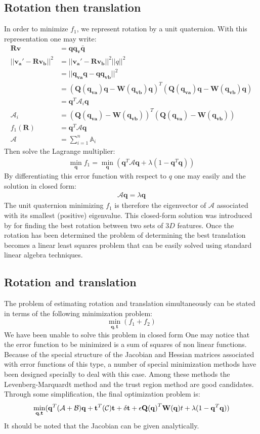 \documentclass[a4paper]{report}
\begin{document}
\subsection{Rotation then translation}
In order to minimize $f_1$, we represent rotation by a unit quaternion. With this
representation one may write:
\begin{align}
\mathbf{R}\mathbf{v}&=\mathbf{qq_v\bar{q}} \\
||\mathbf{v_a'-Rv_b}||^2&=||\mathbf{v_a'-Rv_b}||^2||q||^2 \\
&=||\mathbf{q_{va}q-qq_{vb}}||^2 \\
&=(\mathbf{Q(q_{va})q-W(q_{vb})q})^T(\mathbf{Q(q_{va})q-W(q_{vb})q}) \\
&=\mathbf{q}^T\mathcal{A}_i\mathbf{q} \\
\mathcal{A}_i&=(\mathbf{Q(q_{va})-W(q_{vb})})^T(\mathbf{Q(q_{va})-W(q_{vb})})\\
f_1(\mathbf{R})&=\mathbf{q}^T\mathcal{A}\mathbf{q} \\
\mathcal{A}&=\sum_{i=1}^{n}\mathbb{A}_i
\end{align}
Then solve the Lagrange multiplier:
\begin{align}
\min_{\mathbf{q}} f_1=\min_{\mathbf{q}} ({\mathbf{q}}^T\mathcal{A}{\mathbf{q}}+\lambda(1-{\mathbf{q}}^T{\mathbf{q}}))
\end{align}
By differentiating this error function with respect to $q$ one may easily and the solution in closed form:
\begin{align}
\mathcal{A}\mathbf{q}=\lambda\mathbf{q}
\end{align}
The unit quaternion minimizing $f_1$ is therefore the eigenvector of $\mathcal{A}$ associated with its smallest (positive) eigenvalue. This closed-form solution was introduced by for finding the best rotation between two sets of $3D$ features.
Once the rotation has been determined the problem of determining the best translation becomes a linear least \- squares problem that can be easily solved using standard linear algebra techniques.

\subsection{Rotation and translation}
The problem of estimating rotation and translation simultaneously can be stated in terms of the following minimization problem:
$$
\min_{\mathbf{q,t}}(f_1+f_2)
$$
We have been unable to solve this problem in closed form One may notice that the error function to be minimized is a sum of squares of non linear functions. Because of the special structure of the Jacobian and Hessian matrices associated with error functions of this type, a number of special minimization methods have been designed specially to deal with this case. Among these methods the Levenberg-Marquardt 
method and the trust region method are good candidates. Through some simplification, the final optimization problem is:
$$
\min_{\mathbf{q,t}} (\mathbf{q}^T(\mathcal{A}+\mathcal{B})\mathbf{q}+
\mathbf{t}^T(\mathcal{C})\mathbf{t}+\delta\mathbf{t}+\epsilon\mathbf{Q(q)}^T\mathbf{W(q)}t+\lambda(1-\mathbf{q}^T\mathbf{q})) \\
$$
It should be noted that the Jacobian can be given analytically.
\end{document}
